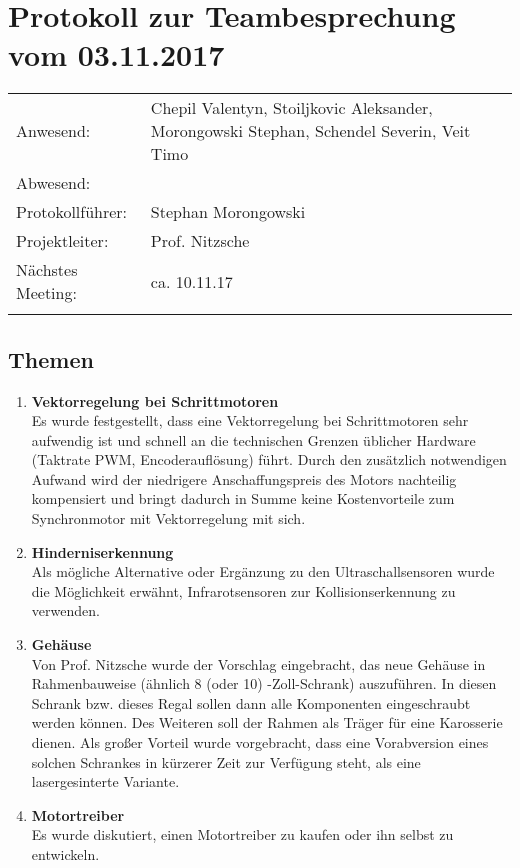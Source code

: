 \documentclass[10pt]{scrartcl}
\begin{document}
\section*{Protokoll zur Teambesprechung vom 03.11.2017}


\begin{tabularx}{\textwidth} {@{\hspace{0.0cm}} lX @{}}
Anwesend: & Chepil Valentyn, Stoiljkovic Aleksander, Morongowski Stephan, Schendel Severin, Veit Timo\\%
Abwesend: & \\
Protokollführer: & Stephan Morongowski \\
Projektleiter: & Prof. Nitzsche\\
Nächstes Meeting: & ca. 10.11.17 \\%
&\\
\end{tabularx}

\subsection*{Themen}
	\begin{enumerate}
		\item \textbf{Vektorregelung bei Schrittmotoren} \\
        Es wurde festgestellt, dass eine Vektorregelung bei Schrittmotoren sehr aufwendig ist und schnell an die technischen Grenzen üblicher Hardware (Taktrate PWM, Encoderauflösung) führt. Durch den zusätzlich notwendigen Aufwand wird der niedrigere Anschaffungspreis des Motors nachteilig kompensiert und bringt dadurch in Summe keine Kostenvorteile zum Synchronmotor mit Vektorregelung mit sich.
		\item \textbf{Hinderniserkennung} \\
        Als mögliche Alternative oder Ergänzung zu den Ultraschallsensoren wurde die Möglichkeit erwähnt, Infrarotsensoren zur Kollisionserkennung zu verwenden.
        \item \textbf{Gehäuse} \\
		Von Prof. Nitzsche wurde der Vorschlag eingebracht, das neue Gehäuse in Rahmenbauweise (ähnlich 8 (oder 10) -Zoll-Schrank) auszuführen. In diesen Schrank bzw. dieses Regal sollen dann alle Komponenten eingeschraubt werden können. Des Weiteren soll der Rahmen als Träger für eine Karosserie dienen. Als großer Vorteil wurde vorgebracht, dass eine Vorabversion eines solchen Schrankes in kürzerer Zeit zur Verfügung steht, als eine lasergesinterte Variante.
        \item \textbf{Motortreiber} \\
        Es wurde diskutiert, einen Motortreiber zu kaufen oder ihn selbst zu entwickeln.
	\end{enumerate}
\end{document}
